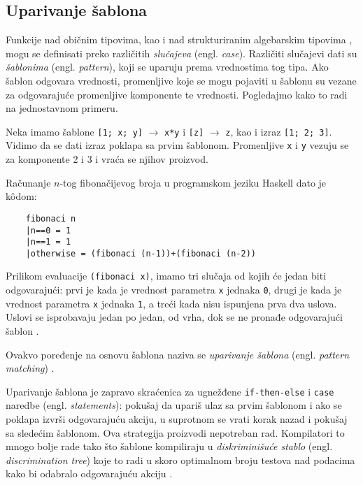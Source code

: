 \subsection{Uparivanje šablona}

Funkcije nad običnim tipovima, kao i nad strukturiranim algebarskim tipovima \cite{algebraic-types}, mogu se definisati preko različitih \textit{slučajeva} (engl. \textit{case}). Različiti slučajevi dati su \textit{šablonima} (engl. \textit{pattern}), koji se uparuju prema vrednostima tog tipa. Ako šablon odgovara vrednosti, promenljive koje se mogu pojaviti u šablonu su vezane za odgovarajuće promenljive komponente te vrednosti. Pogledajmo kako to radi na jednostavnom primeru. 


\begin{primer}
	Neka imamo šablone \verb|[1; x; y]| $\longrightarrow$ \verb|x*y| i \verb|[z]| $\longrightarrow$ \verb|z|, kao i izraz \verb|[1; 2; 3]|. Vidimo da se dati izraz poklapa sa prvim šablonom. Promenljive \verb|x| i \verb|y| vezuju se za komponente 2 i 3 i vraća se njihov proizvod.
\end{primer}


\begin{primer}
	Računanje $n$-tog fibonačijevog broja u programskom jeziku Haskell dato je k\^odom:
	\begin{verbatim}
	fibonaci n
	|n==0 = 1
	|n==1 = 1
	|otherwise = (fibonaci (n-1))+(fibonaci (n-2))
	\end{verbatim}
	Prilikom evaluacije \verb|(fibonaci x)|, imamo tri slučaja od kojih će jedan biti odgovarajući: prvi je kada je vrednost parametra \verb|x| jednaka \verb|0|, drugi je kada je vrednost parametra \verb|x| jednaka \verb|1|, a treći kada nisu ispunjena prva dva uslova. Uslovi se isprobavaju jedan po jedan, od vrha, dok se ne pronađe odgovarajući šablon \cite{the-implementation-of-functional-programming-languages}.
\end{primer}

Ovakvo poređenje na osnovu šablona naziva se \textit{uparivanje šablona} (engl. \textit{pattern matching}) \cite{compiler-design}.

Uparivanje šablona je zapravo skraćenica za ugnežđene \verb|if-then-else| i \verb|case| naredbe (engl. \textit{statements}): pokušaj da upariš ulaz sa prvim šablonom i ako se poklapa izvrši odgovarajuću akciju, u suprotnom se vrati korak nazad i pokušaj sa sledećim šablonom. Ova strategija proizvodi nepotreban rad. Kompilatori to mnogo bolje rade tako što šablone kompiliraju u \textit{diskriminišuće stablo} (engl. \textit{discrimination tree}) koje to radi u skoro optimalnom broju testova nad podacima kako bi odabralo odgovarajuću akciju \cite{compiling-fl}.

